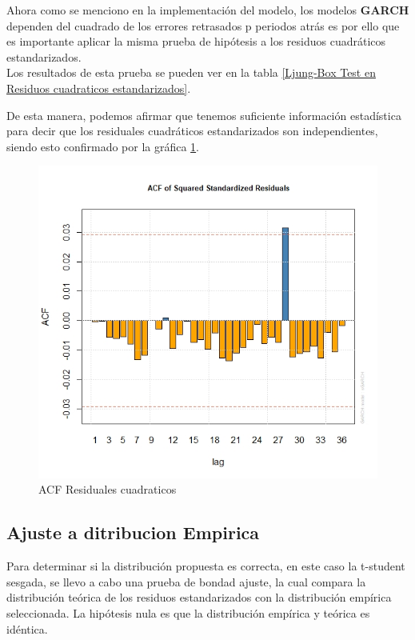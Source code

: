 \bigskip
Ahora como se menciono en la implementación del modelo, los modelos \textbf{GARCH}  dependen del cuadrado de los errores retrasados p periodos atrás
es por ello que es importante aplicar la misma prueba de hipótesis a los residuos cuadráticos estandarizados.
\\
Los resultados de esta prueba se pueden ver en la tabla \ref{Ljung-Box Test en Residuos cuadraticos estandarizados}.






De esta manera, podemos afirmar que tenemos suficiente información estadística para decir que los residuales cuadráticos estandarizados son independientes, siendo esto confirmado  por la gráfica \ref{ACF cuadraticos}.
\bigskip


\begin{figure}[h]
    \centering
    \includegraphics[scale=.5]{Graficos/ACF Residuales.jpeg}
     \caption{ACF Residuales cuadraticos}
    \label{ACF cuadraticos}
\end{figure}




\subsection{Ajuste a ditribucion Empirica}
\bigskip
Para determinar si la distribución propuesta es correcta, en este caso la t-student sesgada, se llevo a cabo una prueba de bondad ajuste, la cual  compara la distribución teórica de los residuos estandarizados con la distribución empírica seleccionada. La hipótesis nula es que la distribución empírica y teórica es idéntica.
\bigskip




